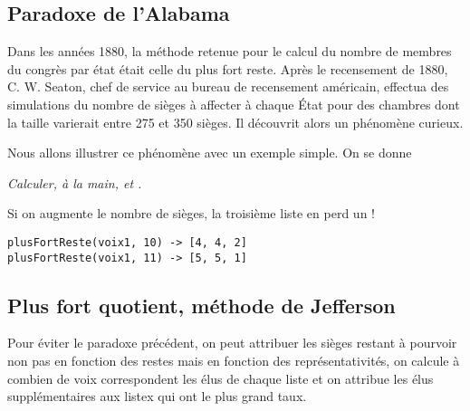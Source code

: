 \subsection{Paradoxe de l'Alabama}
Dans les années 1880, la méthode retenue pour le calcul du nombre de membres du congrès par état était celle du plus fort reste. Après le recensement de 1880, C. W. Seaton, chef de service au bureau de recensement américain, effectua des simulations du nombre de sièges à affecter à chaque État pour des chambres dont la taille varierait entre 275 et 350 sièges. Il découvrit alors un phénomène curieux.

Nous allons illustrer ce phénomène avec un exemple simple.
On se donne 
\begin{Exercise}\it
Calculer, à la main,  et .

Si on augmente le nombre de sièges, la troisième liste en perd un !
\end{Exercise}
\begin{Answer}
\begin{lstlisting}
plusFortReste(voix1, 10) -> [4, 4, 2]
plusFortReste(voix1, 11) -> [5, 5, 1]
\end{lstlisting}
\end{Answer}
\subsection{Plus fort quotient, méthode de Jefferson}
Pour éviter le paradoxe précédent, on peut attribuer les sièges restant à pourvoir non pas en fonction des restes mais en fonction des représentativités, on calcule à combien de voix correspondent les élus de chaque liste et on attribue les élus supplémentaires aux listex qui ont le plus grand taux.

